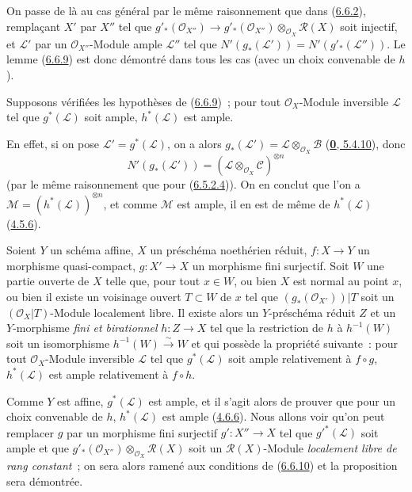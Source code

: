 On passe de là au cas général par le même raisonnement que dans
(\hyperref[II.6.6.2-fr]{6.6.2}), remplaçant $X'$ par $X''$ tel que
$g'_*(\mathcal{O}_{X''})\to
g'_*(\mathcal{O}_{X''})\otimes_{\mathcal{O}_X}\mathcal{R}(X)$
soit injectif, et $\mathcal{L}'$ par un $\mathcal{O}_{X''}$-Module ample
$\mathcal{L}''$ tel que
$N'(g_*(\mathcal{L}'))=N'(g'_*(\mathcal{L}''))$. Le lemme
(\hyperref[II.6.6.9-fr]{6.6.9}) est donc démontré dans tous les cas (avec un
choix convenable de $h$).

\begin{corollary}[6.6.10]
\label{II.6.6.10-fr}
Supposons vérifiées les hypothèses de
\textup{(\hyperref[II.6.6.9-fr]{6.6.9})}~; pour tout $\mathcal{O}_X$-Module inversible
$\mathcal{L}$ tel que $g^*(\mathcal{L})$ soit ample, $h^*(\mathcal{L})$ est
ample.
\end{corollary}

En effet, si on pose $\mathcal{L}'=g^*(\mathcal{L})$, on a alors
$g_*(\mathcal{L}')=\mathcal{L}\otimes_{\mathcal{O}_X}\mathcal{B}$
(\hyperref[0.5.4.10-fr]{\textbf{0}, 5.4.10}), donc
\[
N'(g_*(\mathcal{L}'))=
(\mathcal{L}\otimes_{\mathcal{O}_X}\mathcal{C})^{\otimes n}
\]
(par le même raisonnement que pour
(\hyperref[II.6.5.2.4-fr]{6.5.2.4})). On en conclut que l'on a
$\mathcal{M}=(h^*(\mathcal{L}))^{\otimes n}$, et comme $\mathcal{M}$ est
ample, il en est de même de $h^*(\mathcal{L})$
(\hyperref[II.4.5.6-fr]{4.5.6}).

\begin{proposition}[6.6.11]
\label{II.6.6.11-fr}
Soient $Y$ un schéma affine, $X$ un préschéma noethérien réduit,
$f:X\to Y$ un morphisme quasi-compact, $g:X'\to X$ un morphisme fini
surjectif. Soit $W$ une partie ouverte de $X$ telle que, pour tout $x\in W$,
ou bien $X$ est normal au point $x$, ou bien il existe un voisinage ouvert
$T\subset W$ de $x$ tel que $(g_*(\mathcal{O}_{X'}))|T$ soit un
$(\mathcal{O}_X|T)$-Module localement libre. Il existe alors un
$Y$-préschéma réduit $Z$ et un $Y$-morphisme \emph{fini et birationnel}
$h:Z\to X$ tel que la restriction de $h$ à $h^{-1}(W)$ soit un isomorphisme
$h^{-1}(W)\xrightarrow{\sim}W$ et qui possède la propriété suivante~: pour
tout $\mathcal{O}_X$-Module inversible $\mathcal{L}$ tel que
$g^*(\mathcal{L})$ soit ample relativement à $f\circ g$, $h^*(\mathcal{L})$
est ample relativement à $f\circ h$.
\end{proposition}

Comme $Y$ est affine, $g^*(\mathcal{L})$ est ample, et il s'agit alors de
prouver que pour un choix convenable de $h$, $h^*(\mathcal{L})$ est ample
(\hyperref[II.4.6.6-fr]{4.6.6}). Nous allons voir qu'on peut remplacer $g$
par un morphisme fini surjectif $g':X''\to X$ tel que
${g'}^*(\mathcal{L})$ soit ample et que
$g'_*(\mathcal{O}_{X''})\otimes_{\mathcal{O}_X}\mathcal{R}(X)$ soit un
$\mathcal{R}(X)$-Module \emph{localement libre de rang constant}~; on sera
alors ramené aux conditions de (\hyperref[II.6.6.10-fr]{6.6.10}) et la
proposition sera démontrée.

